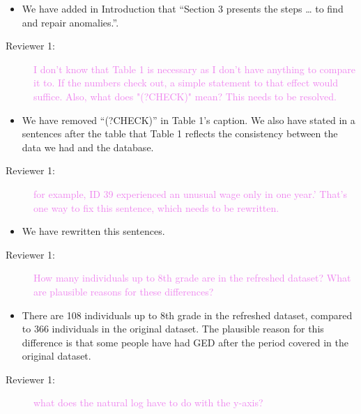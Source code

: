 \documentclass[12pt,a4paper,]{article}
\providecommand{\tightlist}{%
  \setlength{\itemsep}{0pt}\setlength{\parskip}{0pt}}
\begin{document}
\begin{itemize}
\tightlist
\item
  We have added in Introduction that \enquote{Section 3 presents the steps \ldots{} to find and repair anomalies.}.
\end{itemize}

\begin{description}
\item[Reviewer 1:]\textcolor{violet}{I don't know that Table 1 is necessary as I don't have anything to compare it to. If the numbers check out, a simple statement to that effect would suffice. Also, what does "(?CHECK)" mean? This needs to be resolved.}
\end{description}

\begin{itemize}
\tightlist
\item
  We have removed \enquote{(?CHECK)} in Table 1's caption. We also have stated in a sentences after the table that Table 1 reflects the consistency between the data we had and the database.
\end{itemize}

\begin{description}
\item[Reviewer 1:]\textcolor{violet}{for example, ID 39 experienced an unusual wage only in one year.' That's one way to fix this sentence, which needs to be rewritten.}
\end{description}

\begin{itemize}
\tightlist
\item
  We have rewritten this sentences.
\end{itemize}

\begin{description}
\item[Reviewer 1:]\textcolor{violet}{How many individuals up to 8th grade are in the refreshed dataset? What are plausible reasons for these differences?}
\end{description}

\begin{itemize}
\tightlist
\item
  There are 108 individuals up to 8th grade in the refreshed dataset, compared to 366 individuals in the original dataset. The plausible reason for this difference is that some people have had GED after the period covered in the original dataset.
\end{itemize}

\begin{description}
\item[Reviewer 1:]\textcolor{violet}{what does the natural log have to do with the y-axis?}
\end{description}
\end{document}
